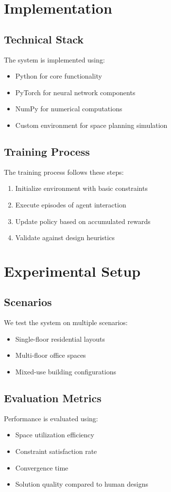 \documentclass[12pt]{article}
\begin{document}
\section{Implementation}
\subsection{Technical Stack}
The system is implemented using:
\begin{itemize}
    \item Python for core functionality
    \item PyTorch for neural network components
    \item NumPy for numerical computations
    \item Custom environment for space planning simulation
\end{itemize}

\subsection{Training Process}
The training process follows these steps:
\begin{enumerate}
    \item Initialize environment with basic constraints
    \item Execute episodes of agent interaction
    \item Update policy based on accumulated rewards
    \item Validate against design heuristics
\end{enumerate}

\section{Experimental Setup}
\subsection{Scenarios}
We test the system on multiple scenarios:
\begin{itemize}
    \item Single-floor residential layouts
    \item Multi-floor office spaces
    \item Mixed-use building configurations
\end{itemize}

\subsection{Evaluation Metrics}
Performance is evaluated using:
\begin{itemize}
    \item Space utilization efficiency
    \item Constraint satisfaction rate
    \item Convergence time
    \item Solution quality compared to human designs
\end{itemize}
\end{document}
